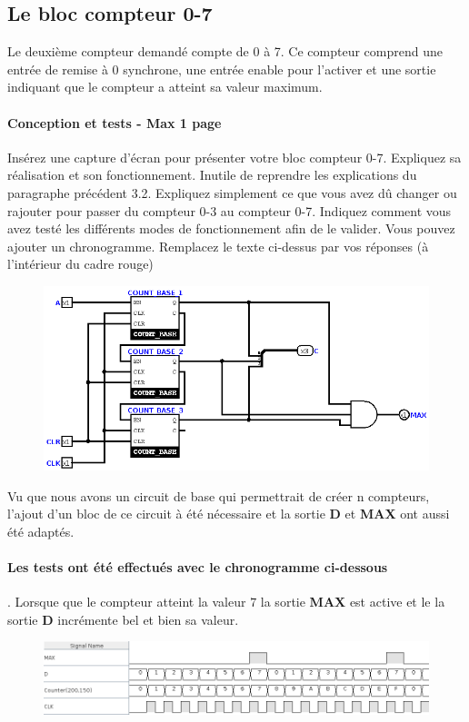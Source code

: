 \documentclass[a4paper]{article} %
\begin{document}
\subsection{Le bloc compteur 0-7}
Le deuxième compteur demandé compte de 0 à 7. Ce compteur comprend une entrée de remise à 0 synchrone, une entrée enable pour l’activer et une sortie indiquant que le compteur a atteint sa valeur maximum.
\begin{tcolorbox}[colframe=Monokaimagenta,colback=white]
\paragraph{Conception et tests - Max 1 page}
Insérez une capture d’écran pour présenter votre bloc compteur 0-7. Expliquez sa réalisation et son fonctionnement. Inutile de reprendre les explications du paragraphe précédent 3.2. Expliquez simplement ce que vous avez dû changer ou rajouter pour passer du compteur 0-3 au compteur 0-7.
Indiquez comment vous avez testé les différents modes de fonctionnement afin de le valider. Vous pouvez ajouter un chronogramme.
Remplacez le texte ci-dessus par vos réponses (à l’intérieur du cadre rouge)

\begin{figure}[H]
\centering
    \includegraphics[width=.8\textwidth]{src/COUNT_8BITS.png}
    \label{fig:count4bits}
\end{figure}

Vu que nous avons un circuit de base qui permettrait de créer n compteurs, l'ajout d'un bloc de ce circuit à été nécessaire et la sortie \textbf{D} et \textbf{MAX} ont aussi été adaptés.

\paragraph{Les tests ont été effectués avec le chronogramme ci-dessous}. Lorsque que le compteur atteint la valeur $7$ la sortie \textbf{MAX} est active et le la sortie \textbf{D} incrémente bel et bien sa valeur.
\begin{figure}[H]
\centering
    \includegraphics[width=.8\textwidth]{src/chrono_COUNT_8.png}
    \label{fig:count8bits}
\end{figure}



\end{tcolorbox}
\end{document}
